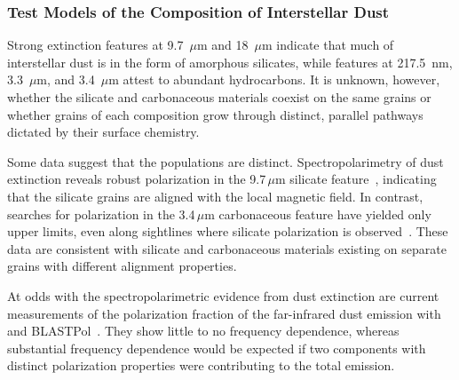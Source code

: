 \documentclass[PICOAPC.tex]{subfiles}
\begin{document}
\subsubsection{Test Models of the Composition of Interstellar Dust}
\label{sec:test_composition_models}

Strong extinction features at 9.7~$\mu$m and 18~$\mu$m indicate that much of interstellar dust is in the form of amorphous silicates, while features at 217.5~nm, 3.3~$\mu$m, and 3.4~$\mu$m attest to abundant hydrocarbons. It is unknown, however, whether the silicate and carbonaceous materials coexist on the same grains or whether grains of each composition grow through distinct, parallel pathways dictated by their surface chemistry. 


Some data suggest that the populations are distinct. Spectropolarimetry of dust extinction reveals robust polarization in the 9.7\,$\mu$m silicate feature~\citep{Smith2000}, indicating that the silicate grains are aligned with the local magnetic field. In contrast, searches for polarization in the 3.4\,$\mu$m carbonaceous feature have yielded only upper limits, even along sightlines where silicate polarization is observed~\citep{Chiar2006,Mason2007}. These data are consistent with silicate and carbonaceous materials existing on separate grains with different alignment properties. 


At odds with the spectropolarimetric evidence from dust extinction are current measurements of the polarization fraction of the far-infrared dust emission with \planck~\citep{Planck_Int_XXII} and BLASTPol~\citep{Ashton2018}. They show little to no frequency dependence, whereas substantial frequency dependence would be expected if two components with distinct polarization properties were contributing to the total emission. 
\end{document}
